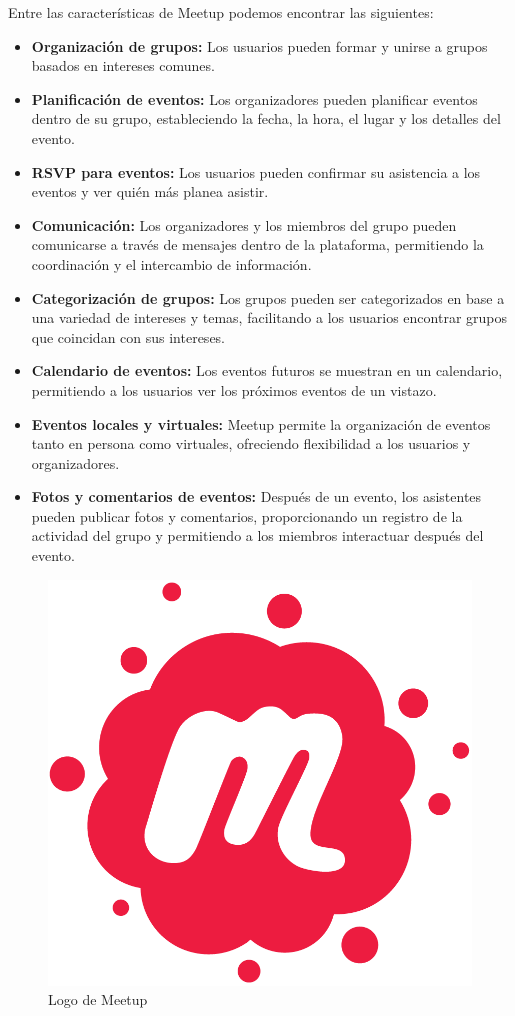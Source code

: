 Entre las características de Meetup podemos encontrar las siguientes:

\begin{itemize}
  \item \textbf{Organización de grupos:} Los usuarios pueden formar y unirse a grupos basados en intereses comunes.
  \item \textbf{Planificación de eventos:} Los organizadores pueden planificar eventos dentro de su grupo, estableciendo 
  la fecha, la hora, el lugar y los detalles del evento.
  \item \textbf{RSVP para eventos:} Los usuarios pueden confirmar su asistencia a los eventos y ver quién más planea asistir.
  \item \textbf{Comunicación:} Los organizadores y los miembros del grupo pueden comunicarse a través de mensajes dentro de 
  la plataforma, permitiendo la coordinación y el intercambio de información.
  \item \textbf{Categorización de grupos:} Los grupos pueden ser categorizados en base a una variedad de intereses y 
  temas, facilitando a los usuarios encontrar grupos que coincidan con sus intereses.
  \item \textbf{Calendario de eventos:} Los eventos futuros se muestran en un calendario, permitiendo a los usuarios 
  ver los próximos eventos de un vistazo.
  \item \textbf{Eventos locales y virtuales:} Meetup permite la organización de eventos tanto en persona como virtuales, 
  ofreciendo flexibilidad a los usuarios y organizadores.
  \item \textbf{Fotos y comentarios de eventos:} Después de un evento, los asistentes pueden publicar fotos y 
  comentarios, proporcionando un registro de la actividad del grupo y permitiendo a los miembros interactuar después del evento.
\end{itemize}
\begin{figure}[H]
        \centering
        \includegraphics[width=.5\linewidth]{images/Meetup_Logo.png}
        \caption{Logo de Meetup}
        \label{fig:meetup_logo}
    \end{figure}


